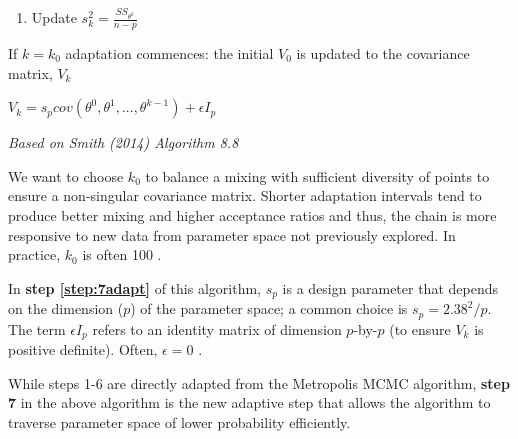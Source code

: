 \documentclass{article}
\begin{document}
\begin{tcolorbox}
\begin{enumerate}
\begin{enumerate}
\begin{itemize}
            \item If $\theta^*$ is accepted
            \begin{center}
                $\theta^k = \theta^*$, $SS_{\theta^k} = SS_{\theta^*}$
            \end{center}
            \item Else
            \begin{center}
                $\theta^k = \theta^{k-1}$, $SS_{\theta^k} = SS_{\theta^{k-1}}$
            \end{center}
        \end{itemize}
        \item Update $s_k^2 = \frac{SS_{\theta^k}}{n-p}$
    \end{enumerate}
    \begin{tcolorbox}[colback=red!5,colframe=red!75!black,title=Adaptive Step]
    \item If $k = k_0$ adaptation commences: the initial $V_0$ is updated to the covariance matrix, $V_{k}$ \label{step:7adapt}
    \begin{center}
       $V_{k} = s_{p}cov(\theta^{0},\theta^{1},...,\theta^{k-1}) + \epsilon I_{p}$
    \end{center}
    \end{tcolorbox}
    
\end{enumerate}
\emph{Based on Smith (2014) Algorithm 8.8}
\end{tcolorbox}
\par We want to choose $k_0$ to balance a mixing with sufficient diversity of points to ensure a non-singular covariance matrix. Shorter adaptation intervals tend to produce better mixing and higher acceptance ratios \cite{convergence_mixing} and thus, the chain is more responsive to new data from parameter space not previously explored. In practice, $k_0$ is often 100 \cite{smithCh8}. 
\par In \textbf{step \ref{step:7adapt}} of this algorithm, $s_{p}$ is a design parameter that depends on the dimension ($p$) of the parameter space; a common choice is $s_{p} = 2.38^{2}/p$. The term $\epsilon I_{p}$ refers to an identity matrix of dimension $p$-by-$p$ (to ensure $V_{k}$ is positive definite). Often, $\epsilon = 0$ \cite{smithCh8}.
\par While steps 1-6 are directly adapted from the Metropolis MCMC algorithm, \textbf{step 7} in the above algorithm is the new adaptive step that allows the algorithm to traverse parameter space of lower probability efficiently.
\end{document}
